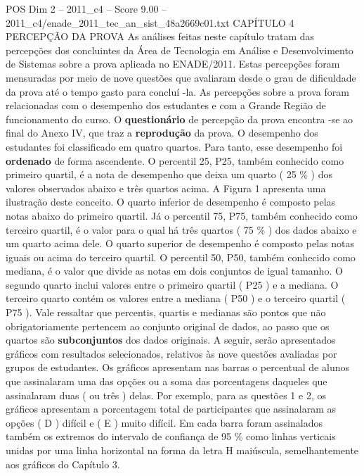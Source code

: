 \begin{textsample}{POS Dim 2 – 2011\_c4 – Score 9.00 – 2011\_c4/enade\_2011\_tec\_an\_sist\_48a2669c01.txt}  \label{ex:f2_pos_126}
CAPÍTULO 4 PERCEPÇÃO DA PROVA As análises feitas neste capítulo tratam das percepções dos concluintes da Área de Tecnologia em Análise e Desenvolvimento de Sistemas sobre a prova aplicada no ENADE/2011.
Estas percepções foram mensuradas por meio de nove questões que avaliaram desde o grau de dificuldade da prova até o tempo gasto para concluí -la.
As percepções sobre a prova foram relacionadas com o desempenho dos estudantes e com a Grande Região de funcionamento do curso.
O \textbf{questionário} de percepção da prova encontra -se ao final do Anexo IV, que traz a \textbf{reprodução} da prova.
O desempenho dos estudantes foi classificado em quatro quartos.
Para tanto, esse desempenho foi \textbf{ordenado} de forma ascendente.
O percentil 25, P25, também conhecido como primeiro quartil, é a nota de desempenho que deixa um quarto ( 25 \% ) dos valores observados abaixo e três quartos acima.
A Figura 1 apresenta uma ilustração deste conceito.
O quarto inferior de desempenho é composto pelas notas abaixo do primeiro quartil.
Já o percentil 75, P75, também conhecido como terceiro quartil, é o valor para o qual há três quartos ( 75 \% ) dos dados abaixo e um quarto acima dele.
O quarto superior de desempenho é composto pelas notas iguais ou acima do terceiro quartil.
O percentil 50, P50, também conhecido como mediana, é o valor que divide as notas em dois conjuntos de igual tamanho.
O segundo quarto inclui valores entre o primeiro quartil ( P25 ) e a mediana.
O terceiro quarto contém os valores entre a mediana ( P50 ) e o terceiro quartil ( P75 ).
Vale ressaltar que percentis, quartis e medianas são pontos que não obrigatoriamente pertencem ao conjunto original de dados, ao passo que os quartos são \textbf{subconjuntos} dos dados originais.
A seguir, serão apresentados gráficos com resultados selecionados, relativos às nove questões avaliadas por grupos de estudantes.
Os gráficos apresentam nas barras o percentual de alunos que assinalaram uma das opções ou a soma das porcentagens daqueles que assinalaram duas ( ou três ) delas.
Por exemplo, para as questões 1 e 2, os gráficos apresentam a porcentagem total de participantes que assinalaram as opções ( D ) difícil e ( E ) muito difícil.
Em cada barra foram assinalados também os extremos do intervalo de confiança de 95 \% como linhas verticais unidas por uma linha horizontal na forma da letra H maiúscula, semelhantemente aos gráficos do Capítulo 3.

\end{textsample}
